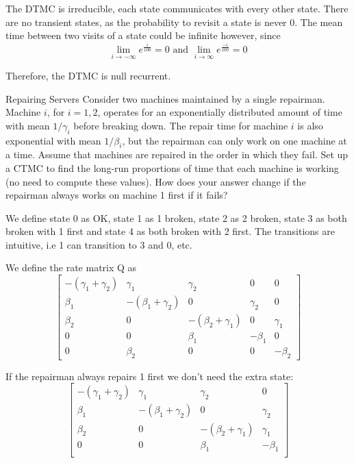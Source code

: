 \begin{solution}
  The DTMC is irreducible, each state communicates with every other state. There are no transient states, as the probability to revisit a state is never 0. The mean time between two visits of a state could be infinite however, since
  \[
    \lim_{i\rightarrow -\infty} e^{\frac{i}{100}} = 0 \text{ and } \lim_{i\rightarrow \infty} e^{\frac{-i}{100}} = 0
  \]

  Therefore, the DTMC is null recurrent.
\end{solution}

\begin{problem}{Repairing Servers}
Consider two machines maintained by a single repairman. Machine \( i \), for \( i = 1, 2 \), operates for an exponentially distributed amount of time with mean \( 1/\gamma_i \) before breaking down. The repair time for machine \( i \) is also exponential with mean \( 1/\beta_i \), but the repairman can only work on one machine at a time. Assume that machines are repaired in the order in which they fail. Set up a CTMC to find the long-run proportions of time that each machine is working (no need to compute these values). How does your answer change if the repairman always works on machine 1 first if it fails?
\end{problem}

\begin{solution}
  We define state 0 as OK, state 1 as 1 broken, state 2 as 2 broken, state 3 as both broken with 1 first and state 4 as both broken with 2 first. The transitions are intuitive, i.e 1 can transition to 3 and 0, etc.

  We define the rate matrix Q as
  \[
  \begin{bmatrix}
    -(\gamma_1 + \gamma_2)& \gamma_1 & \gamma_2 & 0 & 0 \\
    \beta_1 & -(\beta_1 + \gamma_2) & 0 & \gamma_2 & 0 \\
    \beta_2 & 0 & -(\beta_2 + \gamma_1) & 0 & \gamma_1 \\
    0 & 0 & \beta_1 & -\beta_1 & 0 \\
    0 & \beta_2 & 0 & 0 & -\beta_2
  \end{bmatrix}
  \]

  If the repairman always repairs 1 first we don't need the extra state:
  \[
  \begin{bmatrix}
    -(\gamma_1 + \gamma_2)& \gamma_1 & \gamma_2 & 0 \\
    \beta_1 & -(\beta_1 + \gamma_2) & 0 & \gamma_2 \\
    \beta_2 & 0 & -(\beta_2 + \gamma_1) & \gamma_1 \\
    0 & 0 & \beta_1 & -\beta_1  \\
  \end{bmatrix}
  \]

\end{solution}


